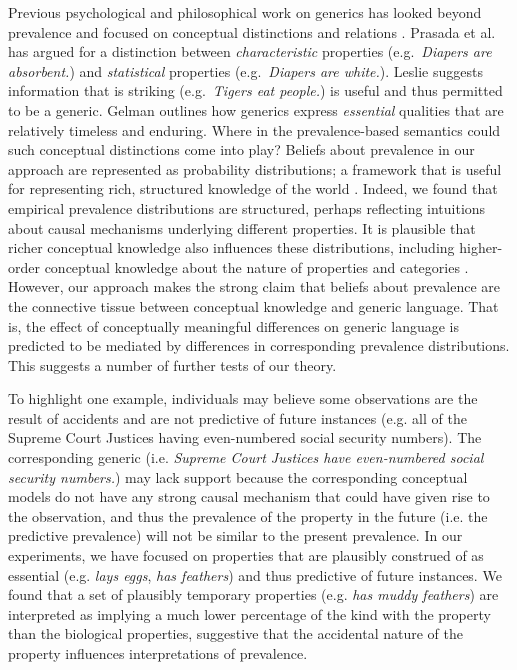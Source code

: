 \documentclass[10pt,letterpaper]{article}
\begin{document}
Previous psychological and philosophical work on generics has looked beyond prevalence and focused on conceptual distinctions and relations \cite{Gelman2005,Prasada2013,Leslie2007,Leslie2008}. 
Prasada et al. has argued for a distinction between \emph{characteristic} properties (e.g.~\emph{Diapers are absorbent.}) and \emph{statistical} properties (e.g.~\emph{Diapers are white.}).
Leslie suggests information that is striking (e.g.~\emph{Tigers eat people.}) is useful and thus permitted to be a generic.
Gelman outlines how generics express \emph{essential} qualities that are relatively timeless and enduring. %
Where in the prevalence-based semantics could such conceptual distinctions come into play?
Beliefs about prevalence in our approach are represented as probability distributions; a framework that is useful for representing rich, structured knowledge of the world \cite{Goodmanconcepts}. 
Indeed, we found that empirical prevalence distributions are structured, perhaps reflecting intuitions about causal mechanisms underlying different properties.
It is plausible that richer conceptual knowledge also influences these distributions, including higher-order conceptual knowledge about the nature of properties and categories \cite{Gelman2005,Keil1992}. 
However, our approach makes the strong claim that beliefs about prevalence are the connective tissue between conceptual knowledge and generic language.
That is, the effect of conceptually meaningful differences on generic language is predicted to be mediated by differences in corresponding prevalence distributions.
This suggests a number of further tests of our theory.

To highlight one example, individuals may believe some observations are the result of accidents and are not predictive of future instances (e.g. all of the Supreme Court Justices having even-numbered social security numbers). 
The corresponding generic (i.e. \emph{Supreme Court Justices have even-numbered social security numbers.}) may lack support because the corresponding conceptual models do not have any strong causal mechanism that could have given rise to the observation, and thus the prevalence of the property in the future (i.e. the predictive prevalence) will not be similar to the present prevalence. 
In our experiments, we have focused on properties that are plausibly construed of as essential (e.g. \emph{lays eggs}, \emph{has feathers}) and thus predictive of future instances. 
We found that a set of plausibly temporary properties (e.g. \emph{has muddy feathers}) are interpreted as implying a much lower percentage of the kind with the property than the biological properties, suggestive that the accidental nature of the property influences interpretations of prevalence.
\end{document}
